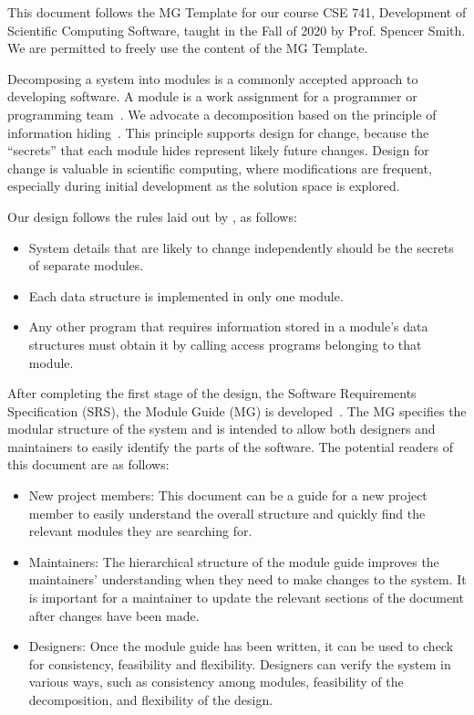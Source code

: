 \documentclass[12pt, titlepage]{article}
\begin{document}
This document follows the MG Template for our course CSE 741, Development
of Scientific Computing Software, taught in the Fall of 2020 by Prof. Spencer Smith.
We are permitted to freely use the content of the MG Template.

Decomposing a system into modules is a commonly accepted approach to developing
software.  A module is a work assignment for a programmer or programming
team~\citep{ParnasEtAl1984}.  We advocate a decomposition
based on the principle of information hiding~\citep{Parnas1972a}.  This
principle supports design for change, because the ``secrets'' that each module
hides represent likely future changes.  Design for change is valuable in scientific computing,
where modifications are frequent, especially during initial development as the
solution space is explored.  

Our design follows the rules laid out by \citet{ParnasEtAl1984}, as follows:
\begin{itemize}
\item System details that are likely to change independently should be the
  secrets of separate modules.
\item Each data structure is implemented in only one module.
\item Any other program that requires information stored in a module's data
  structures must obtain it by calling access programs belonging to that module.
\end{itemize}

After completing the first stage of the design, the Software Requirements
Specification (SRS), the Module Guide (MG) is developed~\citep{ParnasEtAl1984}. The MG
specifies the modular structure of the system and is intended to allow both
designers and maintainers to easily identify the parts of the software.  The
potential readers of this document are as follows:

\begin{itemize}
\item New project members: This document can be a guide for a new project member
  to easily understand the overall structure and quickly find the
  relevant modules they are searching for.
\item Maintainers: The hierarchical structure of the module guide improves the
  maintainers' understanding when they need to make changes to the system. It is
  important for a maintainer to update the relevant sections of the document
  after changes have been made.
\item Designers: Once the module guide has been written, it can be used to
  check for consistency, feasibility and flexibility. Designers can verify the
  system in various ways, such as consistency among modules, feasibility of the
  decomposition, and flexibility of the design.
\end{itemize}
\end{document}
